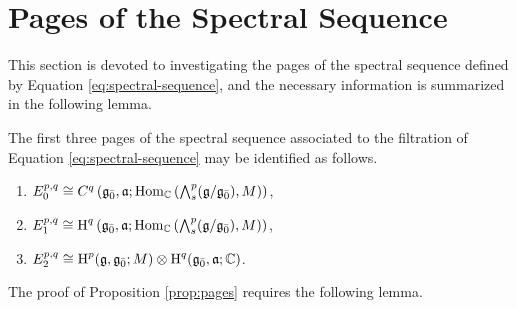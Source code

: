 \section{Pages of the Spectral Sequence}
\label{sec:pages}

This section is devoted to investigating the pages of the spectral sequence defined by Equation \ref{eq:spectral-sequence}, and the necessary information is summarized in the following lemma.

\begin{proposition} \label{prop:pages}
  The first three pages of the spectral sequence associated to the filtration of Equation \ref{eq:spectral-sequence} may be identified as follows.
  \begin{enumerate}[\indent\rm (a)]
    \itemsep.5em
  \item $E_0^{p,q} \cong C^q\left({\mathfrak{g}}_{\bar{0}},\mathfrak{a};\operatorname{Hom}_{\mathbb{C}} \left(\bigwedge\nolimits^{p}_s(\mathfrak{g}/{\mathfrak{g}}_{\bar{0}}),M\right)\right)$,
  \item $E_1^{p,q} \cong \operatorname{H}^q\left({\mathfrak{g}}_{\bar{0}},\mathfrak{a};\operatorname{Hom}_{\mathbb{C}}\left(\bigwedge\nolimits^{p}_s(\mathfrak{g}/{\mathfrak{g}}_{\bar{0}}),M\right)\right)$,
  \item $E_2^{p,q} \cong \operatorname{H}^p(\mathfrak{g},{\mathfrak{g}}_{\bar{0}};M) \otimes \operatorname{H}^q({\mathfrak{g}}_{\bar{0}},\mathfrak{a};\mathbb{C})$.
  \end{enumerate}
\end{proposition}

The proof of Proposition \ref{prop:pages} requires the following lemma.

